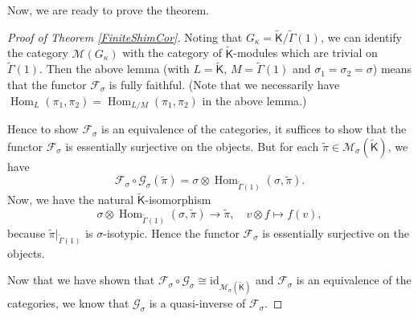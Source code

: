 \documentclass[10pt, letterpaper]{amsart}
\theoremstyle{plain}
\theoremstyle{definition}
\numberwithin{equation}{section}
\newcommand{\pit}{\tilde{\pi}}
\newcommand{\Hom}{\operatorname{Hom}}
\newcommand{\Kf}{\mathsf{K}}
\newcommand{\Gammaf}{\mathsf{\Gamma}}
\begin{document}
Now, we are ready to prove the theorem.

\begin{proof}[Proof of Theorem \ref{FiniteShimCor}]
Noting that $G_\kappa=\widetilde{\Kf}\slash \widetilde{\Gammaf}(1)$, we can identify the category $\mathcal{M}(G_\kappa)$ with the category of $\widetilde{\Kf}$-modules which are trivial on $\widetilde{\Gammaf}(1)$. Then the above lemma (with $L=\widetilde{\Kf}$, $M=\widetilde{\Gammaf}(1)$ and $\sigma_1=\sigma_2=\sigma$) means that the functor $\mathcal{F}_\sigma$ is fully faithful. (Note that we necessarily have $\Hom_L(\pi_1,\pi_2)=\Hom_{L\slash M}(\pi_1,\pi_2)$ in the above lemma.)

Hence to show $\mathcal{F}_\sigma$ is an equivalence of the categories, it suffices to show that the functor $\mathcal{F}_\sigma$ is essentially surjective on the objects. But for each $\pit\in\mathcal{M}_\sigma(\widetilde{\Kf})$, we have
\[
\mathcal{F}_\sigma\circ\mathcal{G}_\sigma(\pit)=\sigma\otimes \Hom_{\widetilde{\Gammaf}(1)}(\sigma, \pit).
\]
Now, we have the natural $\widetilde{\Kf}$-isomorphism
\[
\sigma\otimes \Hom_{\widetilde{\Gammaf}(1)}(\sigma, \pit)\longrightarrow \pit,\quad  v\otimes f\mapsto f(v),
\]
because $\pit|_{\widetilde{\Gammaf}(1)}$ is $\sigma$-isotypic. Hence the functor $\mathcal{F}_\sigma$ is essentially surjective on the objects.

Now that we have shown that $\mathcal{F}_\sigma\circ\mathcal{G}_\sigma\cong \mathrm{id}_{\mathcal{M}_\sigma(\widetilde{\Kf})}$ and $\mathcal{F}_\sigma$ is an equivalence of the categories, we know that $\mathcal{G}_\sigma$ is a quasi-inverse of $\mathcal{F}_\sigma$.

\end{proof}
\end{document}
